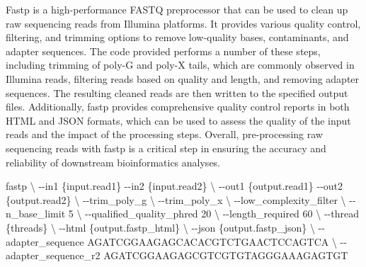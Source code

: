 \documentclass[
]{book}
\newenvironment{Shaded}{\begin{snugshade}}{\end{snugshade}}
\newcommand{\AttributeTok}[1]{\textcolor[rgb]{0.13,0.29,0.53}{#1}}
\newcommand{\DataTypeTok}[1]{\textcolor[rgb]{0.13,0.29,0.53}{#1}}
\newcommand{\ExtensionTok}[1]{#1}
\newcommand{\NormalTok}[1]{#1}
\begin{document}
Fastp is a high-performance FASTQ preprocessor that can be used to clean up raw sequencing reads from Illumina platforms. It provides various quality control, filtering, and trimming options to remove low-quality bases, contaminants, and adapter sequences. The code provided performs a number of these steps, including trimming of poly-G and poly-X tails, which are commonly observed in Illumina reads, filtering reads based on quality and length, and removing adapter sequences. The resulting cleaned reads are then written to the specified output files. Additionally, fastp provides comprehensive quality control reports in both HTML and JSON formats, which can be used to assess the quality of the input reads and the impact of the processing steps. Overall, pre-processing raw sequencing reads with fastp is a critical step in ensuring the accuracy and reliability of downstream bioinformatics analyses.

\small

\begin{Shaded}
\begin{Highlighting}[]
\ExtensionTok{fastp} \DataTypeTok{\textbackslash{}}
      \AttributeTok{{-}{-}in1}\NormalTok{ \{input.read1\} }\AttributeTok{{-}{-}in2}\NormalTok{ \{input.read2\} }\DataTypeTok{\textbackslash{}}
      \AttributeTok{{-}{-}out1}\NormalTok{ \{output.read1\} }\AttributeTok{{-}{-}out2}\NormalTok{ \{output.read2\} }\DataTypeTok{\textbackslash{}}
      \AttributeTok{{-}{-}trim\_poly\_g} \DataTypeTok{\textbackslash{}}
      \AttributeTok{{-}{-}trim\_poly\_x} \DataTypeTok{\textbackslash{}}
      \AttributeTok{{-}{-}low\_complexity\_filter} \DataTypeTok{\textbackslash{}}
      \AttributeTok{{-}{-}n\_base\_limit}\NormalTok{ 5 }\DataTypeTok{\textbackslash{}}
      \AttributeTok{{-}{-}qualified\_quality\_phred}\NormalTok{ 20 }\DataTypeTok{\textbackslash{}}
      \AttributeTok{{-}{-}length\_required}\NormalTok{ 60 }\DataTypeTok{\textbackslash{}}
      \AttributeTok{{-}{-}thread}\NormalTok{ \{threads\} }\DataTypeTok{\textbackslash{}}
      \AttributeTok{{-}{-}html}\NormalTok{ \{output.fastp\_html\} }\DataTypeTok{\textbackslash{}}
      \AttributeTok{{-}{-}json}\NormalTok{ \{output.fastp\_json\} }\DataTypeTok{\textbackslash{}}
      \AttributeTok{{-}{-}adapter\_sequence}\NormalTok{ AGATCGGAAGAGCACACGTCTGAACTCCAGTCA }\DataTypeTok{\textbackslash{}}
      \AttributeTok{{-}{-}adapter\_sequence\_r2}\NormalTok{  AGATCGGAAGAGCGTCGTGTAGGGAAAGAGTGT}
\end{Highlighting}
\end{Shaded}
\end{document}
